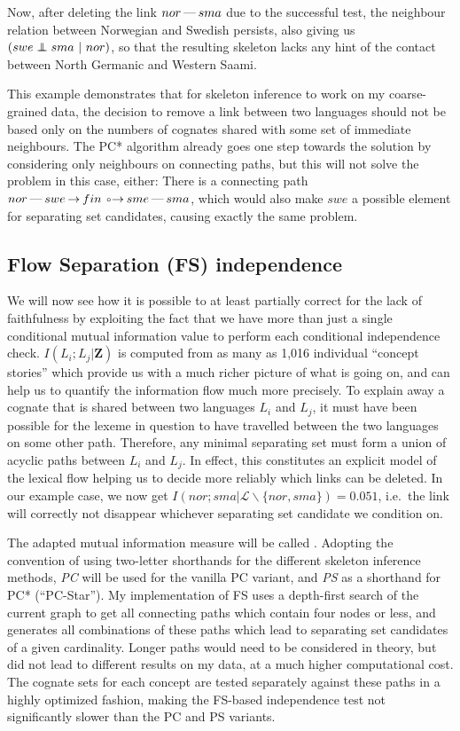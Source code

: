 Now, after deleting the link $nor \arrowLL sma$ due to the successful test, the neighbour relation between Norwegian and Swedish persists, also giving us $(swe \indep sma\ |\ nor)$, so that the resulting skeleton lacks any hint of the contact between North Germanic and Western Saami.

This example demonstrates that for skeleton inference to work on my coarse-grained data, the decision to remove a link between two languages should not be based only on the numbers of cognates shared with some set of immediate neighbours. The PC* algorithm already goes one step towards the solution by considering only neighbours on connecting paths, but this will not solve the problem in this case, either: There is a connecting path $nor \arrowLL swe \arrowLA fin \arrowOA sme \arrowLL sma$, which would also make $swe$ a possible element for separating set candidates, causing exactly the same problem.

\largerpage
\subsection{Flow Separation (FS) independence}
We will now see how it is possible to at least partially correct for the lack of faithfulness by exploiting the fact that we have more than just a single conditional mutual information value to perform each conditional independence check. $I(L_i;L_j|\mathbf{Z})$ is computed from as many as 1,016 individual ``concept stories'' which provide us with a much richer picture of what is going on, and can help us to quantify the information flow much more precisely. To explain away a cognate that is shared between two languages $L_i$ and $L_j$, it must have been possible for the lexeme in question to have travelled between the two languages on some other path. Therefore, any minimal separating set must form a union of acyclic paths between $L_i$ and $L_j$. In effect, this constitutes an explicit model of the lexical flow helping us to decide more reliably which links can be deleted. In our example case, we now get $I(nor;sma|\mathcal{L}\backslash\{nor,sma\}) = 0.051$, i.e.\ the link will correctly not disappear whichever 
separating set candidate we condition on.

The adapted mutual information measure will be called \textit{}. Adopting the convention of using two-letter shorthands for the different skeleton inference methods, \textit{PC} will be used for the vanilla PC variant, and \textit{PS} as a shorthand for PC* (``PC-Star''). My implementation of FS uses a depth-first search of the current graph to get all connecting paths which contain four nodes or less, and generates all combinations of these paths which lead to separating set candidates of a given cardinality. Longer paths would need to be considered in theory, but did not lead to different results on my data, at a much higher computational cost. The cognate sets for each concept are tested separately against these paths in a highly optimized fashion, making the FS-based independence test not significantly slower than the PC and PS variants.

